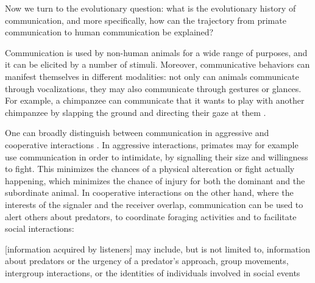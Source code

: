 Now we turn to the evolutionary question: what is the evolutionary history of communication, and more specifically, how can the trajectory from primate communication to human communication be explained?


Communication is used by non-human animals for a wide range of purposes, and it can be elicited by a number of stimuli. Moreover, communicative behaviors can manifest themselves in different modalities: not only can animals communicate through vocalizations, they may also communicate through gestures or glances. For example, a chimpanzee can communicate that it wants to play with another chimpanzee by slapping the ground and directing their gaze at them \citep{Call07}.

One can broadly distinguish between communication in aggressive and cooperative interactions \citep{SeyfarthCheney03}. In aggressive interactions, primates may for example use communication in order to intimidate, by signalling their size and willingness to fight. This minimizes the chances of a physical altercation or fight actually happening, which minimizes the chance of injury for both the dominant and the subordinate animal.
In cooperative interactions on the other hand, where the interests of the signaler and the receiver overlap, communication can be used to alert others about predators, to coordinate foraging activities and to facilitate social interactions:
\begin{quoting}
    {[information acquired by listeners]} may include, but is not limited to, information about predators or the urgency of a predator’s approach, group movements, intergroup interactions, or the identities of individuals involved in social events
    \hfill \citep[p.~168]{SeyfarthCheney03}
\end{quoting}

